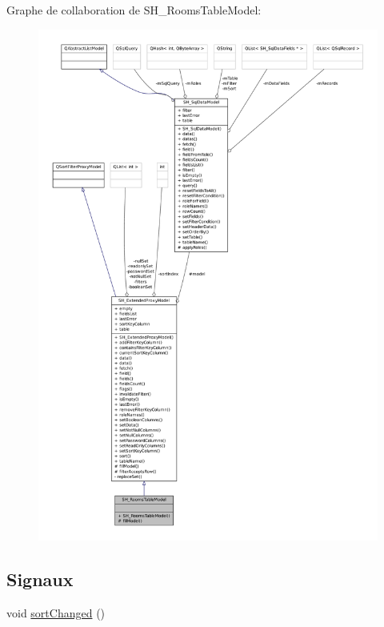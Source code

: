 Graphe de collaboration de S\-H\-\_\-\-Rooms\-Table\-Model\-:
\nopagebreak
\begin{figure}[H]
\begin{center}
\leavevmode
\includegraphics[width=350pt]{classSH__RoomsTableModel__coll__graph}
\end{center}
\end{figure}
\subsection*{Signaux}
\begin{DoxyCompactItemize}
\item 
void \hyperlink{classSH__ExtendedProxyModel_a573590c2763d06d07c6509d4c91a06b2}{sort\-Changed} ()
\end{DoxyCompactItemize}

